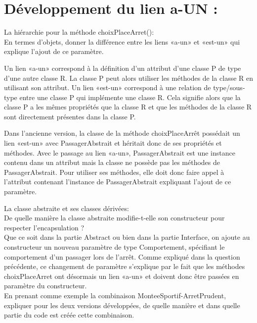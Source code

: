 \documentclass{article}
\begin{document}
\section{Développement du lien a-UN : }
La hiérarchie pour la méthode choixPlaceArret():\\
En termes d’objets, donner la différence entre les liens «a-un» et «est-un» qui explique l’ajout de ce paramètre.\\
\par

Un lien «a-un» correspond à la définition d’un attribut d’une classe P de type d’une autre classe R. La classe P peut alors utiliser les méthodes de la classe R en utilisant son attribut.
Un lien «est-un» correspond à une relation de type/sous-type entre une classe P qui implémente une classe R. Cela signifie alors que la classe P a les mêmes propriétés que la classe R et que les méthodes de la classe R sont directement présentes dans la classe P.
\par
Dans l’ancienne version, la classe de la méthode choixPlaceArrêt possédait un lien «est-un» avec PassagerAbstrait et héritait donc de ses propriétés et méthodes. Avec le passage au lien «a-un», PassagerAbstrait est une instance contenu dans un attribut mais la classe ne possède pas les méthodes de PassagerAbstrait. Pour utiliser ses méthodes, elle doit donc faire appel à l’attribut contenant l’instance de PassagerAbstrait expliquant l’ajout de ce paramètre.

\newline
La classe abstraite et ses classes dérivées:\\

De quelle manière la classe abstraite modifie-t-elle son constructeur pour respecter l’encapsulation ?\\

Que ce soit dans la partie Abstract ou bien dans la partie Interface, on ajoute au constructeur un nouveau paramètre de type Comportement, spécifiant le comportement d’un passager lors de l’arrêt. Comme expliqué dans la question précédente, ce changement de paramètre s’explique par le fait que les méthodes choixPlaceArret ont désormais un lien «a-un» et doivent donc être passées en paramètre du constructeur.
\\

En prenant comme exemple la combinaison MonteeSportif-ArretPrudent, expliquer pour les deux versions développées, de quelle manière et dans quelle partie du code est créée cette combinaison.\\ \\
\end{document}
